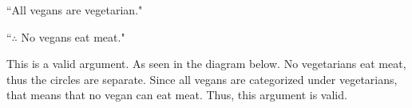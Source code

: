 \documentclass{article}
\begin{document}
\begin{enumerate}
``All vegans are vegetarian." 

``$\therefore$ No vegans eat meat."

This is a valid argument. As seen in the diagram below. No vegetarians eat meat, thus the circles are separate. Since all vegans are categorized under vegetarians, that means that no vegan can eat meat. Thus, this argument is valid.

    
\end{enumerate}
\end{document}

